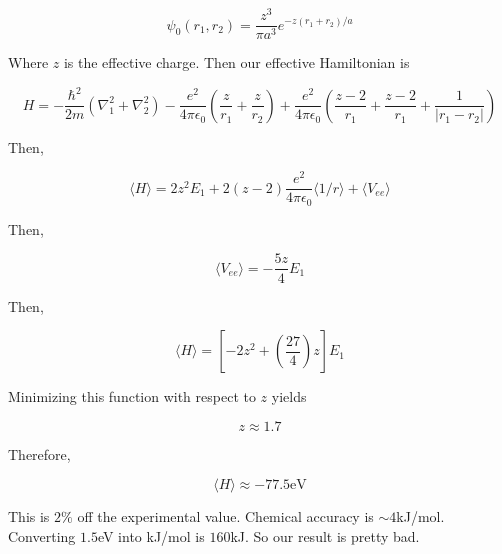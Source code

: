 \documentclass{article}
\newtheorem{one minute paper}[theorem]{One Minute Paper}
\begin{document}
\begin{equation}
    \psi_0(r_1, r_2) = \frac{z^3}{\pi a^3}e^{-z(r_1 + r_2)/a}
\end{equation}

Where $z$ is the effective charge. Then our effective Hamiltonian is 

\begin{equation}
    H = -\frac{\hbar^2}{2m}\left( \nabla_1^2 + \nabla_2^2 \right) - \frac{e^2}{4\pi \epsilon_0}\left( \frac{z}{r_1} + \frac{z}{r_2} \right) + \frac{e^2}{4\pi \epsilon_0}\left( \frac{z - 2}{r_1} + \frac{z - 2}{r_1} + \frac{1}{|r_1 - r_2|} \right)
\end{equation}

Then, 

\begin{equation}
    \langle H \rangle = 2z^2 E_1 + 2(z - 2)\frac{e^2}{4\pi \epsilon_0}\langle 1/r \rangle + \langle V_{ee} \rangle 
\end{equation}

Then, 

\begin{equation}
    \langle V_{ee} \rangle = -\frac{5z}{4}E_1
\end{equation}

Then, 

\begin{equation}
    \langle H \rangle = \left[-2z^2 + \left( \frac{27}{4} \right)z\right]E_1
\end{equation}

Minimizing this function with respect to $z$ yields 

\begin{equation}
    z \approx 1.7
\end{equation}

Therefore, 

\begin{equation}
    \langle H \rangle \approx -77.5 \text{eV}
\end{equation}

This is $2\%$ off the experimental value. Chemical accuracy is $\sim 4 $kJ/mol. Converting $1.5$eV into kJ/mol is $160$kJ. So our result is pretty bad.  
\end{document}
